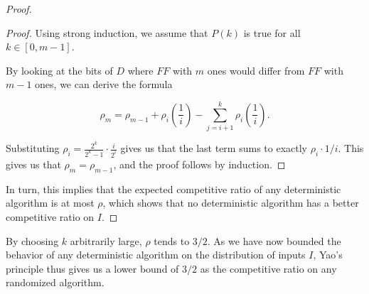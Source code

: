 \begin{proof}
\begin{proof}
Using strong induction, we assume that $P(k)$ is true for all $k \in [0,m-1]$.  





By looking at the bits of $D$ where $FF$ with $m$ ones would differ from $FF$ with $m-1$ ones, we can derive the formula

\[\rho_m = \rho_{m-1} + \rho_i\left(\frac{1}{i}\right) - \sum_{j=i+1}^k \rho_i\left(\frac{1}{i}\right).\]

Substituting $\rho_i = \frac{2^k}{2^k-1}\cdot\frac{i}{2^i}$ gives us that the last term sums to exactly $\rho_i \cdot 1/i$.  This gives us that $\rho_m = \rho_{m-1}$, and the proof follows by induction.
\end{proof}

In turn, this implies that the expected competitive ratio of any deterministic algorithm is at most $\rho$, which shows that no deterministic algorithm has a better competitive ratio on $I$. 
\end{proof}

By choosing $k$ arbitrarily large, $\rho$ tends to $3/2$. As we have now bounded the behavior of any deterministic algorithm on the distribution of inputs $I$, Yao's principle thus gives us a lower bound of $3/2$ as the competitive ratio on any randomized algorithm.

